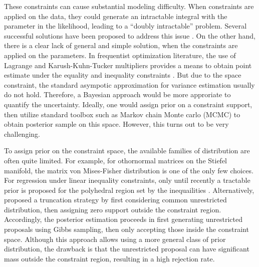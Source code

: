 \documentclass[10pt]{article}
\begin{document}
These constraints can cause substantial modeling difficulty. When constraints are applied on the data, they could generate an intractable integral with the parameter in the likelihood, leading to a ``doubly intractable'' problem. Several successful solutions have been proposed to address this issue \citep{murray2012mcmc,rao2016data}.
On the other hand, there is a clear lack of general and simple solution, when the constraints are applied on the parameters. In frequentist optimization literature, the use of Lagrange and Karush-Kuhn-Tucker multipliers provides a means to obtain point estimate under the equality and inequality constraints \citep{boyd2004convex}. But due to the space constraint, the standard asympotic approximation for variance estimation usually do not hold. Therefore, a Bayesian approach would be more approriate to quantify the uncertainty. Ideally, one would assign prior on a constraint support, then utilize standard toolbox such as Markov chain Monte carlo (MCMC) to obtain posterior sample on this space. However, this turns out to be very challenging.

To assign prior on the constraint space, the available families of distribution are often quite limited. For example, for othornormal matrices on the Stiefel manifold, the matrix von Mises-Fisher distribution \citep{khatri1977mises} is one of the only few choices. For regression under linear inequality constraints, only until recently a tractable prior is proposed for the polyhedral region set by the inequailities \citep{danaher2012minkowski}. Alternatively, \cite{gelfand1992bayesian} proposed a truncation strategy by first considering common unrestricted distribution, then assigning zero support outside the constraint region. Accordingly, the posterior estimation proceeds in first generating unrestricted proposals using Gibbs sampling, then only accepting those inside the constraint space. Although this approach allows using a more general class of prior distribution, the drawback is that the unrestricted proposal can have significant mass outside the constraint region, resulting in a high rejection rate.
\end{document}
